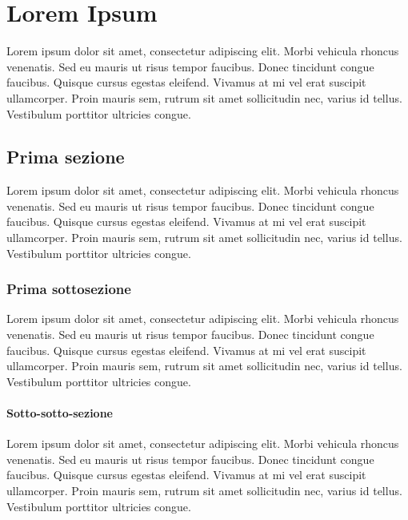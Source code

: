 \documentclass[12pt, a4paper, oneside, openright]{book}
\theoremstyle{definition}
\numberwithin{definition}{chapter}
\theoremstyle{definition}
\numberwithin{assumption}{chapter}
\theoremstyle{remark}
\numberwithin{example}{chapter}
\theoremstyle{remark}
\numberwithin{remark}{chapter}
\theoremstyle{plain}
\numberwithin{theorem}{chapter}
\numberwithin{corollary}{chapter}
\numberwithin{lemma}{chapter}
\numberwithin{proposition}{chapter}
\begin{document}
\mainmatter
\pagestyle{fancy}


\chapter{Lorem Ipsum}
Lorem ipsum dolor sit amet, consectetur adipiscing elit. Morbi vehicula rhoncus venenatis. Sed eu mauris ut risus tempor faucibus. Donec tincidunt congue faucibus. Quisque cursus egestas eleifend. Vivamus at mi vel erat suscipit ullamcorper. Proin mauris sem, rutrum sit amet sollicitudin nec, varius id tellus. Vestibulum porttitor ultricies congue.

\section{Prima sezione}
Lorem ipsum dolor sit amet, consectetur adipiscing elit. Morbi vehicula rhoncus venenatis. Sed eu mauris ut risus tempor faucibus. Donec tincidunt congue faucibus. Quisque cursus egestas eleifend. Vivamus at mi vel erat suscipit ullamcorper. Proin mauris sem, rutrum sit amet sollicitudin nec, varius id tellus. Vestibulum porttitor ultricies congue.

\subsection{Prima sottosezione}
Lorem ipsum dolor sit amet, consectetur adipiscing elit. Morbi vehicula rhoncus venenatis. Sed eu mauris ut risus tempor faucibus. Donec tincidunt congue faucibus. Quisque cursus egestas eleifend. Vivamus at mi vel erat suscipit ullamcorper. Proin mauris sem, rutrum sit amet sollicitudin nec, varius id tellus. Vestibulum porttitor ultricies congue.

\subsubsection{Sotto-sotto-sezione}
Lorem ipsum dolor sit amet, consectetur adipiscing elit. Morbi vehicula rhoncus venenatis. Sed eu mauris ut risus tempor faucibus. Donec tincidunt congue faucibus. Quisque cursus egestas eleifend. Vivamus at mi vel erat suscipit ullamcorper. Proin mauris sem, rutrum sit amet sollicitudin nec, varius id tellus. Vestibulum porttitor ultricies congue.
\end{document}

